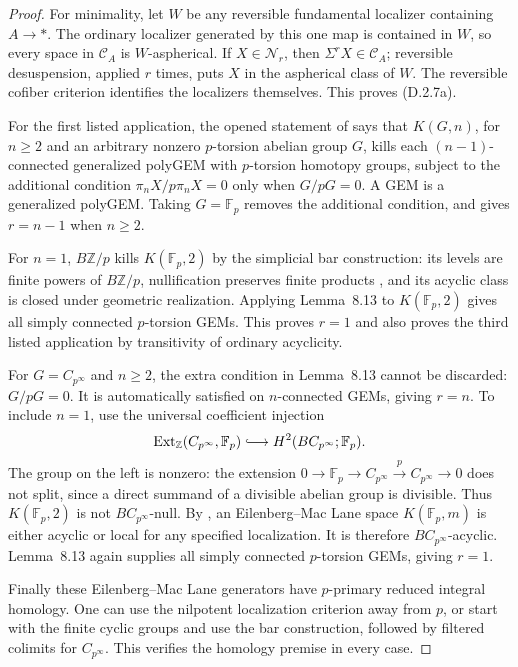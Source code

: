 \begin{proof}
For minimality, let $W$ be any reversible fundamental localizer
containing $A\to *$. The ordinary localizer generated by this one map
is contained in $W$, so every space in $\mathcal C_A$ is
$W$-aspherical. If $X\in\mathcal N_r$, then
$\Sigma^rX\in\mathcal C_A$; reversible desuspension, applied $r$
times, puts $X$ in the aspherical class of $W$. The reversible cofiber
criterion identifies the localizers themselves. This proves
\textup{(D.2.7a)}.

For the first listed application, the opened statement of
\citet[Lemma~8.13]{EH5Bousfield1997} says that $K(G,n)$, for
$n\geq2$ and an arbitrary nonzero $p$-torsion abelian group $G$,
kills each $(n-1)$-connected generalized polyGEM with $p$-torsion
homotopy groups, subject to the additional condition
$\pi_nX/p\pi_nX=0$ only when $G/pG=0$. A GEM is a generalized
polyGEM. Taking $G=\mathbb F_p$ removes the additional condition,
and gives $r=n-1$ when $n\geq2$.

For $n=1$, $B\mathbb Z/p$ kills $K(\mathbb F_p,2)$ by the
simplicial bar construction: its levels are finite powers of
$B\mathbb Z/p$, nullification preserves finite products
\citep[proof of Theorem~1.7]{Bousfield1996ULP}, and its acyclic
class is closed under geometric realization. Applying Lemma~8.13 to
$K(\mathbb F_p,2)$ gives all simply connected $p$-torsion GEMs.
This proves $r=1$ and also proves the third listed application by
transitivity of ordinary acyclicity.

For $G=C_{p^\infty}$ and $n\geq2$, the extra condition in
Lemma~8.13 cannot be discarded: $G/pG=0$. It is automatically
satisfied on $n$-connected GEMs, giving $r=n$. To include $n=1$,
use the universal coefficient injection
\[
 \operatorname{Ext}_{\mathbb Z}(C_{p^\infty},\mathbb F_p)
  \lhook\joinrel\longrightarrow
 H^2(BC_{p^\infty};\mathbb F_p).
\]
The group on the left is nonzero: the extension
$0\to\mathbb F_p\to C_{p^\infty}\xrightarrow{p}C_{p^\infty}\to0$
does not split, since a direct summand of a divisible abelian group is
divisible. Thus $K(\mathbb F_p,2)$ is not
$BC_{p^\infty}$-null. By
\citet[Lemma~9.13]{EH5Bousfield1997}, an Eilenberg--Mac Lane
space $K(\mathbb F_p,m)$ is either acyclic or local for any specified
localization. It is therefore $BC_{p^\infty}$-acyclic. Lemma~8.13
again supplies all simply connected $p$-torsion GEMs, giving $r=1$.

Finally these Eilenberg--Mac Lane generators have $p$-primary
reduced integral homology. One can use the nilpotent localization
criterion away from $p$, or start with the finite cyclic groups and
use the bar construction, followed by filtered colimits for
$C_{p^\infty}$. This verifies the homology premise in every case.
\end{proof}

